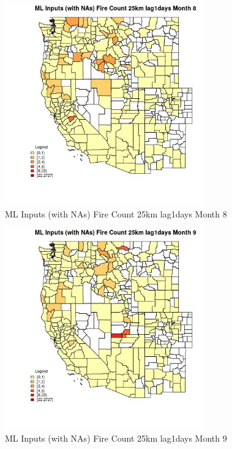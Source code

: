 \begin{figure} 
\centering  
\includegraphics[width=0.77\textwidth]{Code_Outputs/Report_ML_input_PM25_Step4_part_f_de_duplicated_aves_prioritize_24hr_obswNAs_CountyFire_Count_25km_lag1daysmedianMonth8.jpg} 
\caption{\label{fig:Report_ML_input_PM25_Step4_part_f_de_duplicated_aves_prioritize_24hr_obswNAsCountyFire_Count_25km_lag1daysmedianMonth8}ML Inputs (with NAs) Fire Count 25km lag1days Month 8} 
\end{figure} 
 

\begin{figure} 
\centering  
\includegraphics[width=0.77\textwidth]{Code_Outputs/Report_ML_input_PM25_Step4_part_f_de_duplicated_aves_prioritize_24hr_obswNAs_CountyFire_Count_25km_lag1daysmedianMonth9.jpg} 
\caption{\label{fig:Report_ML_input_PM25_Step4_part_f_de_duplicated_aves_prioritize_24hr_obswNAsCountyFire_Count_25km_lag1daysmedianMonth9}ML Inputs (with NAs) Fire Count 25km lag1days Month 9} 
\end{figure} 
 

